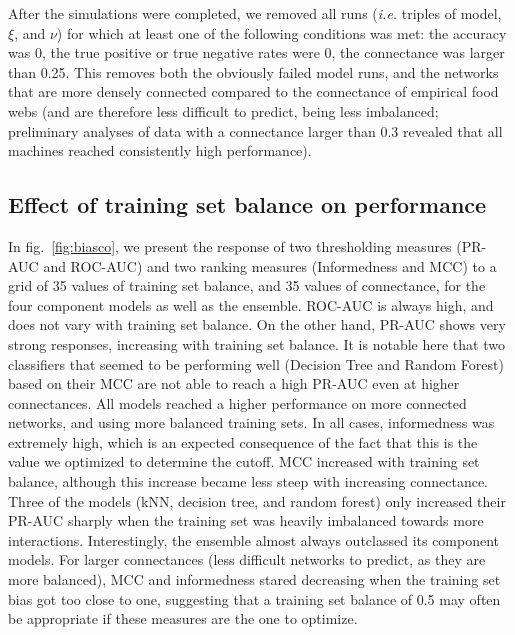 \documentclass[11pt]{article}
\begin{document}
After the simulations were completed, we removed all runs (\emph{i.e.}
triples of model, \(\xi\), and \(\nu\)) for which at least one of the
following conditions was met: the accuracy was 0, the true positive or
true negative rates were 0, the connectance was larger than 0.25. This
removes both the obviously failed model runs, and the networks that are
more densely connected compared to the connectance of empirical food
webs (and are therefore less difficult to predict, being less
imbalanced; preliminary analyses of data with a connectance larger than
0.3 revealed that all machines reached consistently high performance).

\hypertarget{effect-of-training-set-balance-on-performance}{%
\subsection{Effect of training set balance on
performance}\label{effect-of-training-set-balance-on-performance}}

In fig.~\ref{fig:biasco}, we present the response of two thresholding
measures (PR-AUC and ROC-AUC) and two ranking measures (Informedness and
MCC) to a grid of 35 values of training set balance, and 35 values of
connectance, for the four component models as well as the ensemble.
ROC-AUC is always high, and does not vary with training set balance. On
the other hand, PR-AUC shows very strong responses, increasing with
training set balance. It is notable here that two classifiers that
seemed to be performing well (Decision Tree and Random Forest) based on
their MCC are not able to reach a high PR-AUC even at higher
connectances. All models reached a higher performance on more connected
networks, and using more balanced training sets. In all cases,
informedness was extremely high, which is an expected consequence of the
fact that this is the value we optimized to determine the cutoff. MCC
increased with training set balance, although this increase became less
steep with increasing connectance. Three of the models (kNN, decision
tree, and random forest) only increased their PR-AUC sharply when the
training set was heavily imbalanced towards more interactions.
Interestingly, the ensemble almost always outclassed its component
models. For larger connectances (less difficult networks to predict, as
they are more balanced), MCC and informedness stared decreasing when the
training set bias got too close to one, suggesting that a training set
balance of 0.5 may often be appropriate if these measures are the one to
optimize.
\end{document}
